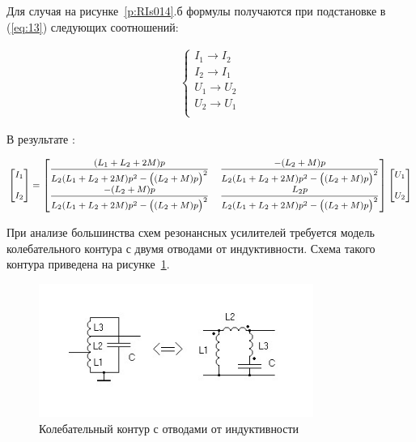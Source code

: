 Для случая на рисунке~\ref{p:RIs014}.б формулы получаются при подстановке в (\ref{eq:13}) следующих соотношений: 

\begin{equation}
\label{eq:14}
\begin{aligned}
 \begin{cases}
I_{1} \to I_{2}\\
I_{2} \to I_{1}\\
U_{1} \to U_{2}\\
U_{2} \to U_{1}\\
 \end{cases}
\end{aligned}
\end{equation}



В результате :


\begin{equation}
\label{eq:15}
\footnotesize
\begin{aligned}
\begin{bmatrix} I_{1}\\ \\ I_{2} \end{bmatrix} = 
\begin{bmatrix} \dfrac{(L_{1} + L_{2} + 2M)p}{L_{2}(L_{1} + L_{2} + 2M)p^{2} - \bigl((L_{2} + M)p\bigr)^{2}} &
                           \dfrac{-(L_{2}+M)p}{L_{2}(L_{1} + L_{2} + 2M)p^{2} - \bigl((L_{2} + M)p\bigr)^{2}}\\ 
						      \dfrac{-(L_{2}+M)p}{L_{2}(L_{1} + L_{2} + 2M)p^{2} - \bigl((L_{2} + M)p\bigr)^{2}} &
							  \dfrac{L_{2}p}{L_{2}(L_{1} + L_{2} + 2M)p^{2} - \bigl((L_{2} + M)p\bigr)^{2}}
\end{bmatrix}
\begin{bmatrix} U_{1}\\ \\  U_{2} \end{bmatrix}
\end{aligned}
\normalsize
\end{equation}



При  анализе  большинства  схем  резонансных  усилителей  требуется модель колебательного контура с двумя отводами от индуктивности. Схема такого контура приведена на рисунке~\ref{p:RIs015}. 

 \begin{figure}[H] \centering
  \includegraphics[width=0.8\textwidth]{./content/RIs015.jpg}
  \caption{Колебательный контур с отводами от индуктивности } \label{p:RIs015}
\end{figure}

